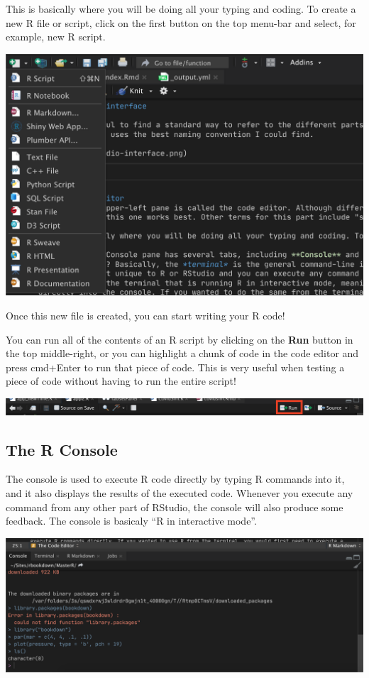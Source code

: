 \documentclass[]{book}
\begin{document}
This is basically where you will be doing all your typing and coding. To create a new R file or script, click on the first button on the top menu-bar and select, for example, new R script.

\includegraphics{images/new-rescript.png}

Once this new file is created, you can start writing your R code!

You can run all of the contents of an R script by clicking on the \textbf{Run} button in the top middle-right, or you can highlight a chunk of code in the code editor and press cmd+Enter to run that piece of code. This is very useful when testing a piece of code without having to run the entire script!

\includegraphics{images/run.png}

\hypertarget{the-r-console}{%
\subsection{The R Console}\label{the-r-console}}

The console is used to execute R code directly by typing R commands into it, and it also displays the results of the executed code. Whenever you execute any command from any other part of RStudio, the console will also produce some feedback. The console is basicaly ``R in interactive mode''.

\includegraphics{images/console.png}
\end{document}
